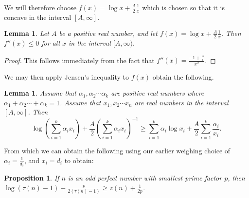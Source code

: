 \documentclass{article}
\newtheorem{lemma}[theorem]{Lemma}
\newtheorem{proposition}[theorem]{Proposition}
\begin{document}


We will therefore choose $f(x) = \log x + \frac{A}{2}\frac{1}{x}$ which is chosen so that it is concave in the interval $[A,\infty]$.

\begin{lemma} Let $A$ be a positive real number, and let $f(x)= \log x + \frac{A}{2}\frac{1}{x}$. Then $f''(x) \leq 0$ for all $x$ in the interval $[A, \infty).$
\end{lemma}
\begin{proof} This follows immediately from the fact that $f''(x) = \frac{-1+ \frac{A}{x}}{x^2}$.
\end{proof}

We may then apply Jensen's inequality to $f(x)$ obtain the following.

\begin{lemma} Assume that $\alpha_1, \alpha_2 \cdots \alpha_k$ are positive real numbers where $\alpha_1 + \alpha_2 \cdots + \alpha_k =1$. Assume that $x_1, x_2 \cdots x_n$ are real numbers in the interval $[A, \infty]$. Then
\begin{equation} \label{GM-AM where we know the smallest value}
\log(\sum_{i=1}^k \alpha_i x_i) + \frac{A}{2}\left(\sum_{i=1}^k \alpha_i x_i\right)^{-1} \geq \sum_{i=1}^k \alpha_i \log x_i + \frac{A}{2}\sum_{i=1}^k  \frac{\alpha_i}{x_i}.
\end{equation}
\end{lemma}

From which we can obtain the following using our earlier weighing choice of $\alpha_i = \frac{1}{d_i}$, and $x_i = d_i$ to obtain:

\begin{proposition} If $n$ is an odd perfect number with smallest prime factor $p$, then 
$\log(\tau(n)-1) + \frac{p}{2(\tau(n)-1)} \geq z(n)  + \frac{1}{2p}$.
\end{proposition}



\end{document}
